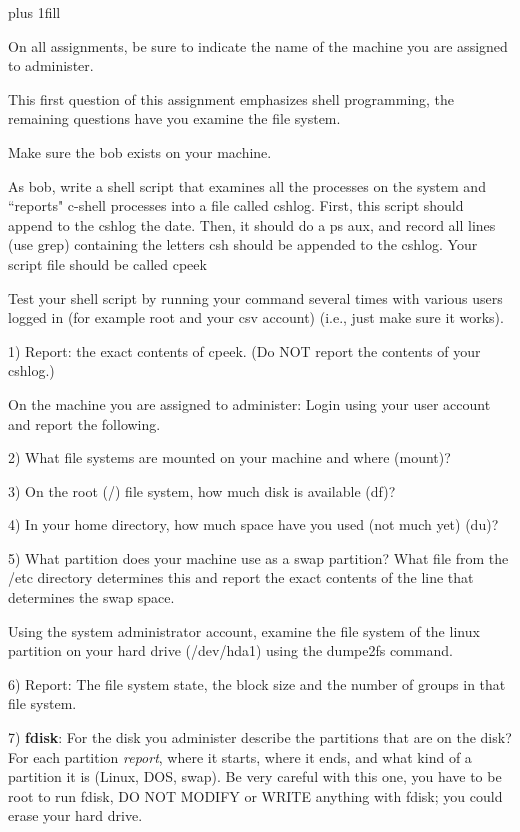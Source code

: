 
\rightskip=0pt plus 1fill

\parindent 0pt

On all assignments, be sure to indicate the name of the
machine you are assigned to administer.

This first question of this assignment emphasizes shell programming,
the remaining questions have you examine the file system.

Make sure the {\ltt{}bob} exists on your 
machine.

As bob, write a shell script that examines all the processes on the
system and ``reports" c-shell processes
into a file called {\ltt{}cshlog}.
First, this script should append to the {\ltt{}cshlog} the {\ltt{}date}.
Then, it should do a {\ltt{}ps aux}, and record all lines (use {\ltt{}grep})
containing the letters csh should be appended to the {\ltt{}cshlog}.
Your script file should be called {\ltt{}cpeek}

Test your shell script by
running your command several times with various users logged 
in (for example root and your csv account)
(i.e., just make sure it works).

1) Report: the exact contents of {\ltt{}cpeek}.
(Do NOT report the contents of your cshlog.)

On the machine you are assigned to administer:
Login using your user account and report the following.

2) What file systems are mounted on your machine and where (mount)?

3) On the root ({\ltt{}/}) file system, how much disk is available (df)?

4) In your home directory, how much space have you used (not much yet) (du)?

5) What partition does your machine use as a swap partition?
What file from the {\ltt{}/etc} directory determines this
and report the exact contents of the line that determines the swap space.

Using the system administrator account,
examine the file system of the linux partition on your hard drive
({\ltt{}/dev/hda1}) using the {\ltt{}dumpe2fs} command.

6) Report: The file system state, the block size and the number of groups
in that file system.

7) {\bf fdisk}:
For the disk you administer describe the partitions that are on the disk?
For each partition {\it report}, where it starts, where it ends, and what kind
of a partition it is (Linux, DOS, swap).
Be very careful with this one, you have to be root to run fdisk,
DO NOT MODIFY or WRITE anything with fdisk; 
you could erase your hard drive.

\bye
